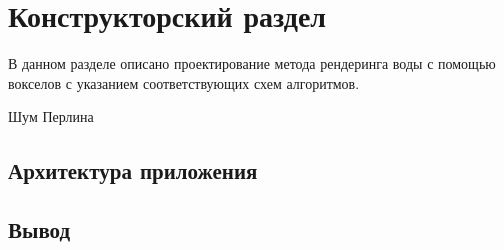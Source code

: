\chapter{Конструкторский раздел}
\label{cha:design}

В данном разделе описано проектирование метода рендеринга воды с помощью вокселов
с указанием соответствующих схем алгоритмов.

Шум Перлина

\section{Архитектура приложения}

\section{Вывод}


